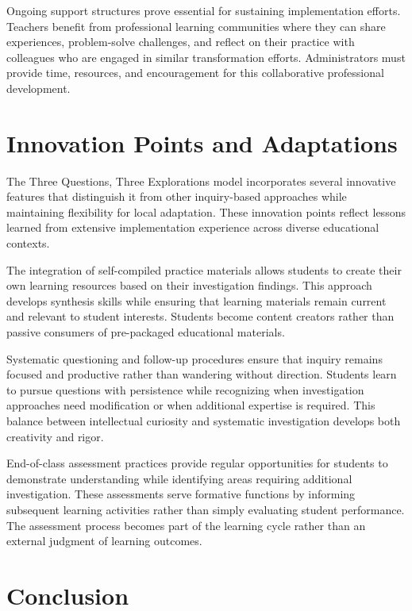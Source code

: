 \documentclass[
  Letterpaper,
]{scrbook}
\begin{document}
Ongoing support structures prove essential for sustaining implementation
efforts. Teachers benefit from professional learning communities where
they can share experiences, problem-solve challenges, and reflect on
their practice with colleagues who are engaged in similar transformation
efforts. Administrators must provide time, resources, and encouragement
for this collaborative professional development.

\section{Innovation Points and
Adaptations}\label{innovation-points-and-adaptations}

The Three Questions, Three Explorations model incorporates several
innovative features that distinguish it from other inquiry-based
approaches while maintaining flexibility for local adaptation. These
innovation points reflect lessons learned from extensive implementation
experience across diverse educational contexts.

The integration of self-compiled practice materials allows students to
create their own learning resources based on their investigation
findings. This approach develops synthesis skills while ensuring that
learning materials remain current and relevant to student interests.
Students become content creators rather than passive consumers of
pre-packaged educational materials.

Systematic questioning and follow-up procedures ensure that inquiry
remains focused and productive rather than wandering without direction.
Students learn to pursue questions with persistence while recognizing
when investigation approaches need modification or when additional
expertise is required. This balance between intellectual curiosity and
systematic investigation develops both creativity and rigor.

End-of-class assessment practices provide regular opportunities for
students to demonstrate understanding while identifying areas requiring
additional investigation. These assessments serve formative functions by
informing subsequent learning activities rather than simply evaluating
student performance. The assessment process becomes part of the learning
cycle rather than an external judgment of learning outcomes.

\section{Conclusion}\label{conclusion-1}
\end{document}
